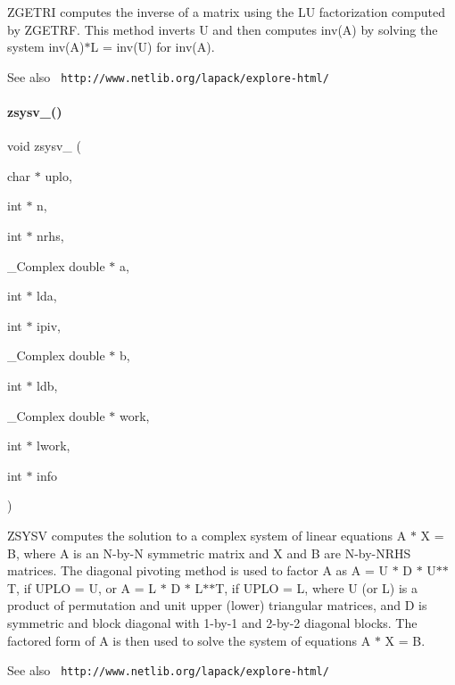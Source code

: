 Z\+G\+E\+T\+RI computes the inverse of a matrix using the LU factorization computed by Z\+G\+E\+T\+RF. This method inverts U and then computes inv(\+A) by solving the system inv(\+A)$\ast$L = inv(\+U) for inv(\+A). \begin{DoxySeeAlso}{See also}
{\texttt{ http\+://www.\+netlib.\+org/lapack/explore-\/html/}} 
\end{DoxySeeAlso}
\mbox{\label{lapack_8h_aa97b75b6555008c4720a3ae650ef9ed2}} 
\paragraph{zsysv\_()}
{\footnotesize\ttfamily void zsysv\+\_\+ (\begin{DoxyParamCaption}\item[{char $\ast$}]{uplo,  }\item[{int $\ast$}]{n,  }\item[{int $\ast$}]{nrhs,  }\item[{\+\_\+\+Complex double $\ast$}]{a,  }\item[{int $\ast$}]{lda,  }\item[{int $\ast$}]{ipiv,  }\item[{\+\_\+\+Complex double $\ast$}]{b,  }\item[{int $\ast$}]{ldb,  }\item[{\+\_\+\+Complex double $\ast$}]{work,  }\item[{int $\ast$}]{lwork,  }\item[{int $\ast$}]{info }\end{DoxyParamCaption})}

Z\+S\+Y\+SV computes the solution to a complex system of linear equations A $\ast$ X = B, where A is an N-\/by-\/N symmetric matrix and X and B are N-\/by-\/\+N\+R\+HS matrices. The diagonal pivoting method is used to factor A as A = U $\ast$ D $\ast$ U$\ast$$\ast$T, if U\+P\+LO = \textquotesingle{}U\textquotesingle{}, or A = L $\ast$ D $\ast$ L$\ast$$\ast$T, if U\+P\+LO = \textquotesingle{}L\textquotesingle{}, where U (or L) is a product of permutation and unit upper (lower) triangular matrices, and D is symmetric and block diagonal with 1-\/by-\/1 and 2-\/by-\/2 diagonal blocks. The factored form of A is then used to solve the system of equations A $\ast$ X = B. \begin{DoxySeeAlso}{See also}
{\texttt{ http\+://www.\+netlib.\+org/lapack/explore-\/html/}} 
\end{DoxySeeAlso}
\mbox{\label{lapack_8h_a130ae850ea77a38ac29edef82d390fa7}} 
